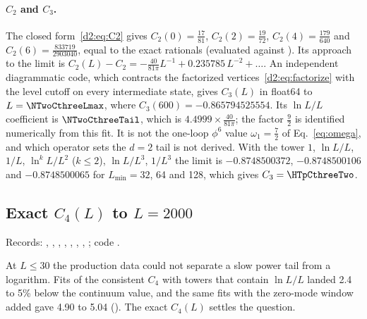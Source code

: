 \paragraph{$C_2$ and $C_3$.} The closed form~\eqref{d2:eq:C2} gives $C_2(0)=\frac{17}{81}$, $C_2(2)=\frac{19}{72}$,
$C_2(4)=\frac{179}{640}$ and $C_2(6)=\frac{833719}{2903040}$, equal to the exact rationals (evaluated against
). Its approach to the limit is
$C_2(L)-C_2=-\frac{40}{81\pi}L^{-1}+0.235785\,L^{-2}+\dots$. An independent diagrammatic code, which contracts the factorized
vertices~\eqref{d2:eq:factorize} with the level cutoff on every intermediate state, gives $C_3(L)$ in float64 to
$L=\NTwoCthreeLmax$, where $C_3(600)=-0.865794525554$. Its $\ln L/L$ coefficient is $\NTwoCthreeTail$, which is
$4.4999\times\frac{40}{81\pi}$; the factor $\frac92$ is identified numerically from this fit. It is not the one-loop $\phi^6$
value $\omega_1=\frac72$ of Eq.~\eqref{eq:omega}, and which operator sets the $d=2$ tail is not derived. With the tower
$1$, $\ln L/L$, $1/L$, $\ln^kL/L^2$ ($k\le2$), $\ln L/L^3$, $1/L^3$ the limit is $-0.8748500372$, $-0.8748500106$ and
$-0.8748500065$ for $L_{\min}=32$, 64 and 128, which gives $C_3=\HTpCthreeTwo$.

\subsection{Exact \texorpdfstring{$C_4(L)$}{C4(L)} to \texorpdfstring{$L=2000$}{L=2000}}\label{d2:app:c4exact}
{\small\raggedright\noindent Records: , ,
, ,
, ,
, ; code .\par}

At $L\le30$ the production data could not separate a slow power tail from a logarithm. Fits of the consistent $C_4$ with
towers that contain $\ln L/L$ landed 2.4 to 5\% below the continuum value, and the same fits with the zero-mode window added
gave 4.90 to 5.04 (). The exact $C_4(L)$ settles the question.

